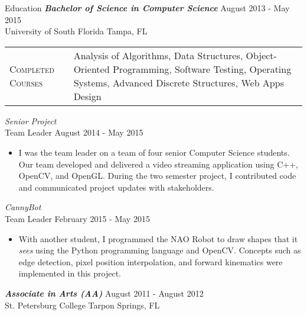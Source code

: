 \begin{section}{Education}
  {\sl \textbf{Bachelor of Science in Computer Science}} \hfill August 2013 - May 2015 \\
  University of South Florida \hfill Tampa, FL \\
  \begin{tabularx}{\linewidth}{@{}l X@{}}
    \textsc{Completed Courses} &\small{Analysis of Algorithms, Data Structures, Object-Oriented Programming, Software Testing, Operating Systems, Advanced Discrete Structures, Web Apps Design}\\
  \end{tabularx}
  {\sl Senior Project} \\ Team Leader \hfill August 2014 - May 2015
  \begin{itemize}
    \item I was the team leader on a team of four senior Computer Science students. Our team developed and delivered a video streaming application using C++, OpenCV, and OpenGL. During the two semester project, I contributed code and communicated project updates with stakeholders.
  \end{itemize}
  {\sl CannyBot} \\ Team Leader \hfill February 2015 - May 2015
  \begin{itemize}
    \item With another student, I programmed the NAO Robot to draw shapes that it \textit{sees} using the Python programming language and OpenCV. Concepts such as edge detection, pixel position interpolation, and forward kinematics were implemented in this project.
  \end{itemize}

  {\sl \textbf{Associate in Arts (AA)}} \hfill August 2011 - August 2012 \\
  St. Petersburg College \hfill Tarpon Springs, FL \\
\end{section}
